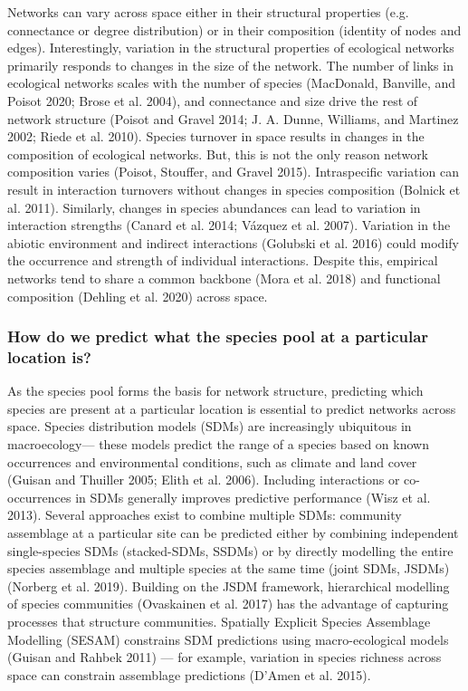 \documentclass[10pt,oneside]{article}
\begin{document}
Networks can vary across space either in their structural properties
(e.g. connectance or degree distribution) or in their composition
(identity of nodes and edges). Interestingly, variation in the
structural properties of ecological networks primarily responds to
changes in the size of the network. The number of links in ecological
networks scales with the number of species (MacDonald, Banville, and
Poisot 2020; Brose et al. 2004), and connectance and size drive the rest
of network structure (Poisot and Gravel 2014; J. A. Dunne, Williams, and
Martinez 2002; Riede et al. 2010). Species turnover in space results in
changes in the composition of ecological networks. But, this is not the
only reason network composition varies (Poisot, Stouffer, and Gravel
2015). Intraspecific variation can result in interaction turnovers
without changes in species composition (Bolnick et al. 2011). Similarly,
changes in species abundances can lead to variation in interaction
strengths (Canard et al. 2014; Vázquez et al. 2007). Variation in the
abiotic environment and indirect interactions (Golubski et al. 2016)
could modify the occurrence and strength of individual interactions.
Despite this, empirical networks tend to share a common backbone (Mora
et al. 2018) and functional composition (Dehling et al. 2020) across
space.

\hypertarget{how-do-we-predict-what-the-species-pool-at-a-particular-location-is}{%
\subsubsection{How do we predict what the species pool at a particular
location
is?}\label{how-do-we-predict-what-the-species-pool-at-a-particular-location-is}}

As the species pool forms the basis for network structure, predicting
which species are present at a particular location is essential to
predict networks across space. Species distribution models (SDMs) are
increasingly ubiquitous in macroecology--- these models predict the
range of a species based on known occurrences and environmental
conditions, such as climate and land cover (Guisan and Thuiller 2005;
Elith et al. 2006). Including interactions or co-occurrences in SDMs
generally improves predictive performance (Wisz et al. 2013). Several
approaches exist to combine multiple SDMs: community assemblage at a
particular site can be predicted either by combining independent
single-species SDMs (stacked-SDMs, SSDMs) or by directly modelling the
entire species assemblage and multiple species at the same time (joint
SDMs, JSDMs) (Norberg et al. 2019). Building on the JSDM framework,
hierarchical modelling of species communities (Ovaskainen et al. 2017)
has the advantage of capturing processes that structure communities.
Spatially Explicit Species Assemblage Modelling (SESAM) constrains SDM
predictions using macro-ecological models (Guisan and Rahbek 2011) ---
for example, variation in species richness across space can constrain
assemblage predictions (D'Amen et al. 2015).
\end{document}
